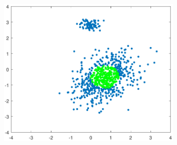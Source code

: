\documentclass[preprint,12pt]{elsarticle}
\begin{document}
\begin{figure}[ht!]
\begin{subfigure}[b]{0.45\linewidth}
		\caption{\label{fig:spatialmedc1}}
	\end{subfigure}
	\begin{subfigure}[b]{0.45\linewidth}
		\centering\includegraphics[width=1\linewidth]{figures/kcstep/c2input.pdf}
		\caption{\label{fig:spatialmedc2}}
	\end{subfigure} \\


\end{figure}
\end{document}
